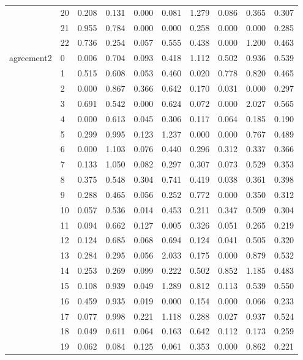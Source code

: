 \begin{table}
\begin{tabular}{llrrrrrrrr}
 & 20 & 0.208 & 0.131 & 0.000 & 0.081 & 1.279 & 0.086 & 0.365 & 0.307 \\
 & 21 & 0.955 & 0.784 & 0.000 & 0.000 & 0.258 & 0.000 & 0.000 & 0.285 \\
 & 22 & 0.736 & 0.254 & 0.057 & 0.555 & 0.438 & 0.000 & 1.200 & 0.463 \\
\cline{1-10}
\multirow[t]{36}{*}{agreement2} & 0 & 0.006 & 0.704 & 0.093 & 0.418 & 1.112 & 0.502 & 0.936 & 0.539 \\
 & 1 & 0.515 & 0.608 & 0.053 & 0.460 & 0.020 & 0.778 & 0.820 & 0.465 \\
 & 2 & 0.000 & 0.867 & 0.366 & 0.642 & 0.170 & 0.031 & 0.000 & 0.297 \\
 & 3 & 0.691 & 0.542 & 0.000 & 0.624 & 0.072 & 0.000 & 2.027 & 0.565 \\
 & 4 & 0.000 & 0.613 & 0.045 & 0.306 & 0.117 & 0.064 & 0.185 & 0.190 \\
 & 5 & 0.299 & 0.995 & 0.123 & 1.237 & 0.000 & 0.000 & 0.767 & 0.489 \\
 & 6 & 0.000 & 1.103 & 0.076 & 0.440 & 0.296 & 0.312 & 0.337 & 0.366 \\
 & 7 & 0.133 & 1.050 & 0.082 & 0.297 & 0.307 & 0.073 & 0.529 & 0.353 \\
 & 8 & 0.375 & 0.548 & 0.304 & 0.741 & 0.419 & 0.038 & 0.361 & 0.398 \\
 & 9 & 0.288 & 0.465 & 0.056 & 0.252 & 0.772 & 0.000 & 0.350 & 0.312 \\
 & 10 & 0.057 & 0.536 & 0.014 & 0.453 & 0.211 & 0.347 & 0.509 & 0.304 \\
 & 11 & 0.094 & 0.662 & 0.127 & 0.005 & 0.326 & 0.051 & 0.265 & 0.219 \\
 & 12 & 0.124 & 0.685 & 0.068 & 0.694 & 0.124 & 0.041 & 0.505 & 0.320 \\
 & 13 & 0.284 & 0.295 & 0.056 & 2.033 & 0.175 & 0.000 & 0.879 & 0.532 \\
 & 14 & 0.253 & 0.269 & 0.099 & 0.222 & 0.502 & 0.852 & 1.185 & 0.483 \\
 & 15 & 0.108 & 0.939 & 0.049 & 1.289 & 0.812 & 0.113 & 0.539 & 0.550 \\
 & 16 & 0.459 & 0.935 & 0.019 & 0.000 & 0.154 & 0.000 & 0.066 & 0.233 \\
 & 17 & 0.077 & 0.998 & 0.221 & 1.118 & 0.288 & 0.027 & 0.937 & 0.524 \\
 & 18 & 0.049 & 0.611 & 0.064 & 0.163 & 0.642 & 0.112 & 0.173 & 0.259 \\
 & 19 & 0.062 & 0.084 & 0.125 & 0.061 & 0.353 & 0.000 & 0.862 & 0.221 \\

\end{tabular}
\end{table}
